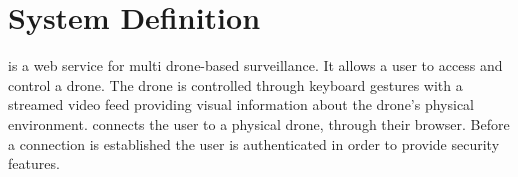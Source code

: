 \section{System Definition}
\projectname{} is a web service for multi drone-based surveillance. It allows a user to access and control a drone. The drone is controlled through keyboard gestures with a streamed video feed providing visual information about the drone's physical environment. \projectname{} connects the user to a physical drone, through their browser. Before a connection is established the user is authenticated in order to provide security features.